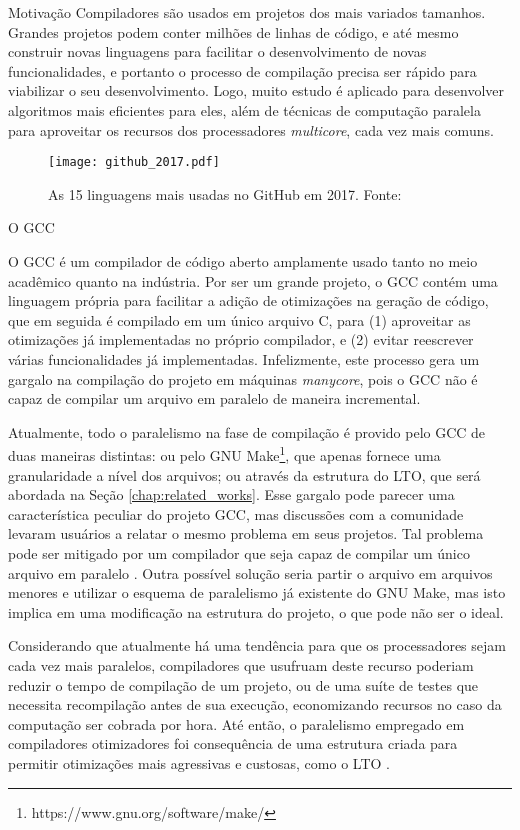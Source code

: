 \begin{subsection}{Motivação}
Compiladores são usados em projetos dos mais variados tamanhos.
Grandes projetos podem conter milhões de linhas de código, e até mesmo
construir novas linguagens para facilitar o desenvolvimento de novas
funcionalidades, e portanto o processo de compilação precisa ser rápido
para viabilizar o seu desenvolvimento. Logo, muito estudo é aplicado
para desenvolver algoritmos mais eficientes para eles, além de técnicas
de computação paralela para aproveitar os recursos dos processadores
\textit{multicore}, cada vez mais comuns.

\begin{figure}[ht]
 \centering
 \texttt{[image: github\_2017.pdf]}
 \caption{As 15 linguagens mais usadas no GitHub em 2017. Fonte: \cite{githuboctoverse}}
 \label{fig:github_2017}
\end{figure}

\end{subsection}

\begin{subsection}{O GCC}

O GCC é um compilador de código aberto amplamente usado tanto no meio
acadêmico quanto na indústria. Por ser um grande projeto, o GCC contém uma
linguagem própria para facilitar a adição de otimizações na geração de
código, que em seguida é compilado em um único arquivo C, para (1)
aproveitar as otimizações já implementadas no próprio compilador, e (2)
evitar reescrever várias funcionalidades já implementadas. Infelizmente, este processo
gera um gargalo na compilação do projeto em máquinas \textit{manycore}, pois o
GCC não é capaz de compilar um arquivo em paralelo de maneira incremental.

Atualmente, todo o paralelismo na fase de compilação é provido pelo GCC de
duas maneiras distintas: ou pelo GNU Make\footnote{https://www.gnu.org/software/make/},
que apenas fornece uma granularidade a nível dos arquivos; ou através da estrutura do
LTO, que será abordada na Seção \ref{chap:related_works}. Esse gargalo pode parecer uma
característica peculiar do projeto GCC, mas discussões com a comunidade levaram
usuários a relatar o mesmo problema em seus projetos. Tal problema pode ser
mitigado por um compilador que seja capaz de compilar um único arquivo em paralelo
\citep{mailgcc} \citep{phoronix}.  Outra possível solução seria
partir o arquivo em arquivos menores e utilizar o esquema de
paralelismo já existente do GNU Make, mas isto implica em uma modificação na
estrutura do projeto, o que pode não ser o ideal.

Considerando que atualmente há uma tendência para que os processadores sejam
cada vez mais paralelos, compiladores que usufruam deste recurso poderiam
reduzir o tempo de compilação de um projeto, ou de uma suíte de testes que
necessita recompilação antes de sua execução, economizando recursos no caso da
computação ser cobrada por hora. Até então, o paralelismo empregado em compiladores
otimizadores foi consequência de uma estrutura criada para permitir otimizações
mais agressivas e custosas, como o LTO \citep{glek2010optimizing}.

\end{subsection}

